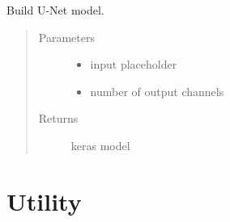 \documentclass[letterpaper,10pt,english]{sphinxmanual}
\begin{document}
\begin{fulllineitems}
\label{\detokenize{index:unet.unet.unet_model}}
Build U-Net model.
\begin{quote}\begin{description}
\item[{Parameters}] \leavevmode\begin{itemize}
\item {} 
 \textendash{} input placeholder

\item {} 
 \textendash{} number of output channels

\end{itemize}

\item[{Returns}] \leavevmode
keras model

\end{description}\end{quote}

\end{fulllineitems}



\chapter{Utility}
\label{\detokenize{index:utility}}
\end{document}
